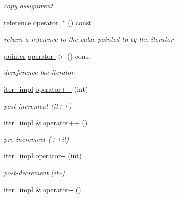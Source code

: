 \begin{DoxyCompactItemize}
\begin{DoxyCompactList}\small\item\em copy assignment \end{DoxyCompactList}\item 
\mbox{\hyperlink{classnlohmann_1_1basic__json_1_1iter__impl_ae09599e9cb4a947020a0265c0c4f3d5e}{reference}} \mbox{\hyperlink{classnlohmann_1_1basic__json_1_1iter__impl_a2850071895be7a875acaee50a19129cc}{operator $\ast$}} () const
\begin{DoxyCompactList}\small\item\em return a reference to the value pointed to by the iterator \end{DoxyCompactList}\item 
\mbox{\hyperlink{classnlohmann_1_1basic__json_1_1iter__impl_a3dddd7fa38b36e2531700ceb4a1ce9a8}{pointer}} \mbox{\hyperlink{classnlohmann_1_1basic__json_1_1iter__impl_afd0d209ef3a07a8aa3ee46e03538ffa6}{operator-\/$>$}} () const
\begin{DoxyCompactList}\small\item\em dereference the iterator \end{DoxyCompactList}\item 
\mbox{\hyperlink{classnlohmann_1_1basic__json_1_1iter__impl}{iter\+\_\+impl}} \mbox{\hyperlink{classnlohmann_1_1basic__json_1_1iter__impl_a74e26f187519bc7181b825b8f38a4e93}{operator++}} (int)
\begin{DoxyCompactList}\small\item\em post-\/increment (it++) \end{DoxyCompactList}\item 
\mbox{\hyperlink{classnlohmann_1_1basic__json_1_1iter__impl}{iter\+\_\+impl}} \& \mbox{\hyperlink{classnlohmann_1_1basic__json_1_1iter__impl_a60e2723dae1c6d537fc914c664f1a81c}{operator++}} ()
\begin{DoxyCompactList}\small\item\em pre-\/increment (++it) \end{DoxyCompactList}\item 
\mbox{\hyperlink{classnlohmann_1_1basic__json_1_1iter__impl}{iter\+\_\+impl}} \mbox{\hyperlink{classnlohmann_1_1basic__json_1_1iter__impl_a0c3a102ac61d4c6f869fe9a5d065e91e}{operator-\/-\/}} (int)
\begin{DoxyCompactList}\small\item\em post-\/decrement (it--) \end{DoxyCompactList}\item 
\mbox{\hyperlink{classnlohmann_1_1basic__json_1_1iter__impl}{iter\+\_\+impl}} \& \mbox{\hyperlink{classnlohmann_1_1basic__json_1_1iter__impl_a50c5d20f733bfe2b13d67366102ba3fe}{operator-\/-\/}} ()

\end{DoxyCompactItemize}
